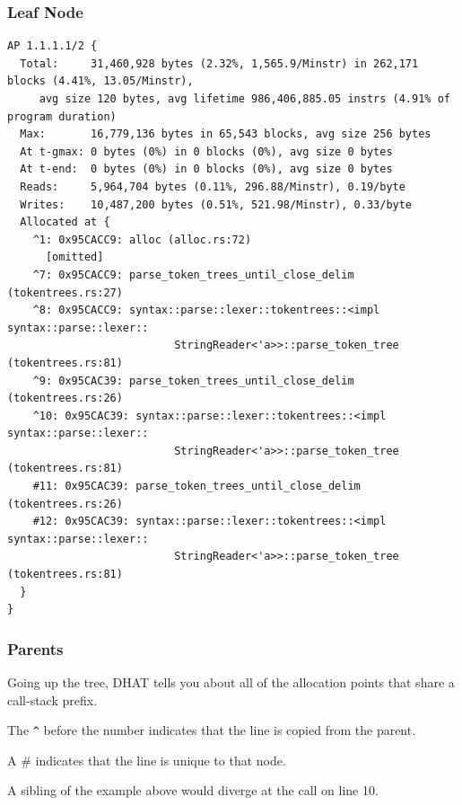 \begin{frame}[fragile]
\frametitle{Leaf Node}

{\scriptsize
\begin{verbatim}
AP 1.1.1.1/2 {
  Total:     31,460,928 bytes (2.32%, 1,565.9/Minstr) in 262,171 blocks (4.41%, 13.05/Minstr), 
     avg size 120 bytes, avg lifetime 986,406,885.05 instrs (4.91% of program duration)
  Max:       16,779,136 bytes in 65,543 blocks, avg size 256 bytes
  At t-gmax: 0 bytes (0%) in 0 blocks (0%), avg size 0 bytes
  At t-end:  0 bytes (0%) in 0 blocks (0%), avg size 0 bytes
  Reads:     5,964,704 bytes (0.11%, 296.88/Minstr), 0.19/byte
  Writes:    10,487,200 bytes (0.51%, 521.98/Minstr), 0.33/byte
  Allocated at {
    ^1: 0x95CACC9: alloc (alloc.rs:72)
      [omitted]
    ^7: 0x95CACC9: parse_token_trees_until_close_delim (tokentrees.rs:27)
    ^8: 0x95CACC9: syntax::parse::lexer::tokentrees::<impl syntax::parse::lexer::
                          StringReader<'a>>::parse_token_tree (tokentrees.rs:81)
    ^9: 0x95CAC39: parse_token_trees_until_close_delim (tokentrees.rs:26)
    ^10: 0x95CAC39: syntax::parse::lexer::tokentrees::<impl syntax::parse::lexer::
                          StringReader<'a>>::parse_token_tree (tokentrees.rs:81)
    #11: 0x95CAC39: parse_token_trees_until_close_delim (tokentrees.rs:26)
    #12: 0x95CAC39: syntax::parse::lexer::tokentrees::<impl syntax::parse::lexer::
                          StringReader<'a>>::parse_token_tree (tokentrees.rs:81)
  }
}
\end{verbatim}
}


\end{frame}


\begin{frame}
\frametitle{Parents}
 Going up the tree, DHAT tells you about all of the allocation points that share a call-stack
prefix. 

The \texttt{\^} before the number indicates that the line is copied from the parent.

A \# indicates that the line is unique to that node.

A sibling of the example above would diverge at the call on line 10.

\end{frame}



